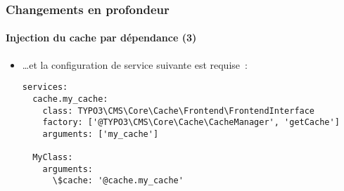 
\begin{frame}[fragile]
	\frametitle{Changements en profondeur}
	\framesubtitle{Injection du cache par dépendance (3)}

	\lstset{basicstyle=\tiny\ttfamily}

	\begin{itemize}
		\item \ldots et la configuration de service suivante est requise~:
\begin{lstlisting}
services:
  cache.my_cache:
    class: TYPO3\CMS\Core\Cache\Frontend\FrontendInterface
    factory: ['@TYPO3\CMS\Core\Cache\CacheManager', 'getCache']
    arguments: ['my_cache']

  MyClass:
    arguments:
      \$cache: '@cache.my_cache'
\end{lstlisting}

	\end{itemize}

\end{frame}


